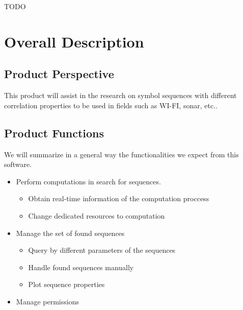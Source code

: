 \documentclass{scrreprt}
\begin{document}
TODO\\



\chapter{Overall Description}

\section{Product Perspective}

This product will assist in the research on symbol sequences with different
correlation properties to be used in fields such as WI-FI, sonar, etc..



\section{Product Functions}

We will summarize in a general way the functionalities we expect from
this software.

\begin{itemize}
  \item Perform computations in search for sequences.\\
          \begin{itemize}
            \item Obtain real-time information of the computation proccess
            \item Change dedicated resources to computation
          \end{itemize}
  \item Manage the set of found sequences
          \begin{itemize}
            \item Query by different parameters of the sequences
            \item Handle found sequences manually
            \item Plot sequence properties
          \end{itemize}
  \item Manage permissions
\end{itemize}
\end{document}

